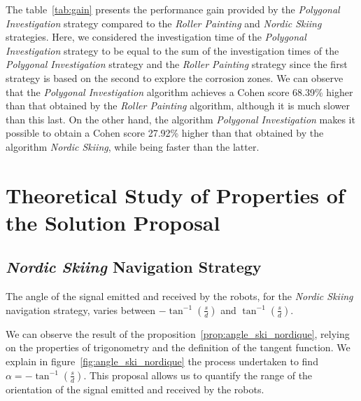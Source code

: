 The table~\ref{tab:gain} presents the performance gain provided by the \textit{Polygonal Investigation} strategy compared to the \textit{Roller Painting} and \textit{Nordic Skiing} strategies.
Here, we considered the investigation time of the \textit{Polygonal Investigation} strategy to be equal to the sum of the investigation times of the \textit{Polygonal Investigation} strategy and the \textit{Roller Painting} strategy since the first strategy is based on the second to explore the corrosion zones.
We can observe that the \textit{Polygonal Investigation} algorithm achieves a Cohen score 68.39\% higher than that obtained by the \textit{Roller Painting} algorithm, although it is much slower than this last.
On the other hand, the algorithm \textit{Polygonal Investigation} makes it possible to obtain a Cohen score 27.92\% higher than that obtained by the algorithm \textit{Nordic Skiing}, while being faster than the latter.

\section{Theoretical Study of Properties of the Solution Proposal}

\subsection*{\textit{Nordic Skiing} Navigation Strategy}

\begin{proposition}
	The angle of the signal emitted and received by the robots, for the \textit{Nordic Skiing} navigation strategy, varies between $-\tan^{-1}(\frac{s}{d})$ and $\tan ^{-1}(\frac{s}{d})$.
	\label{prop:angle_ski_nordique}
\end{proposition}

We can observe the result of the proposition~\ref{prop:angle_ski_nordique}, relying on the properties of trigonometry and the definition of the tangent function.
We explain in figure~\ref{fig:angle_ski_nordique} the process undertaken to find $\alpha = -\tan^{-1}(\frac{s}{d})$.
This proposal allows us to quantify the range of the orientation of the signal emitted and received by the robots.

